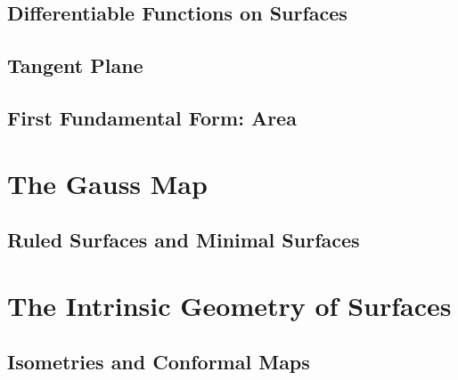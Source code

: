 \documentclass[11pt]{scrartcl}
\theoremstyle{definition}
\theoremstyle{remark}
\begin{document}
\subsection{Differentiable Functions on Surfaces}

\subsection{Tangent Plane}

\subsection{First Fundamental Form: Area}


\section{The Gauss Map}

\subsection{Ruled Surfaces and Minimal Surfaces}


\section{The Intrinsic Geometry of Surfaces}

\subsection{Isometries and Conformal Maps}
\end{document}
